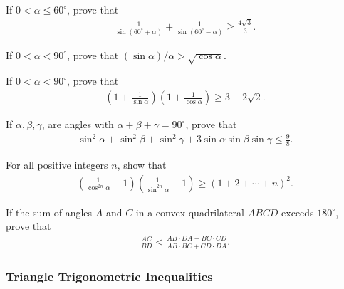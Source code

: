 \begin{question}
    If $0<\alpha\leq 60^\circ$, prove that
    \begin{align*}
        \frac{1}{\sin(60^\circ + \alpha)}+\frac{1}{\sin(60^\circ - \alpha)} \geq \frac{4\sqrt 3}{3}.
    \end{align*}
\end{question}


\begin{question}
    If $0<\alpha<90^\circ$, prove that $(\sin \alpha)/\alpha > \sqrt{\cos \alpha}$.
\end{question}


\begin{question}
    If $0<\alpha<90^\circ$, prove that
    \begin{align*}
        \left(1+\frac{1}{\sin\alpha}\right)\left(1+\frac{1}{\cos\alpha}\right) \geq 3 + 2\sqrt 2.
    \end{align*}
\end{question}


\begin{question}
    If $\alpha,\beta,\gamma$, are angles with $\alpha+\beta+\gamma=90^\circ$, prove that
    \begin{align*}
        \sin^2 \alpha + \sin^2 \beta + \sin^2 \gamma + 3\sin\alpha\sin\beta\sin\gamma \leq \frac{9}{8}. 
    \end{align*}
\end{question}

\begin{question}
    For all positive integers $n$, show that
    \begin{align*}
        \left(\frac{1}{\cos^{2n}\alpha}-1\right)\left(\frac{1}{\sin^{2n}\alpha}-1\right) \geq \left(1+2+\cdots+n\right)^2.
    \end{align*}
\end{question}


\begin{question}
    If the sum of angles $A$ and $C$ in a convex quadrilateral $ABCD$ exceeds $180^\circ$, prove that
    \begin{align*}
        \frac{AC}{BD} < \frac{AB \cdot DA + BC \cdot CD}{AB\cdot BC + CD \cdot DA}.
    \end{align*}
\end{question}


\subsubsection{Triangle Trigonometric Inequalities}


